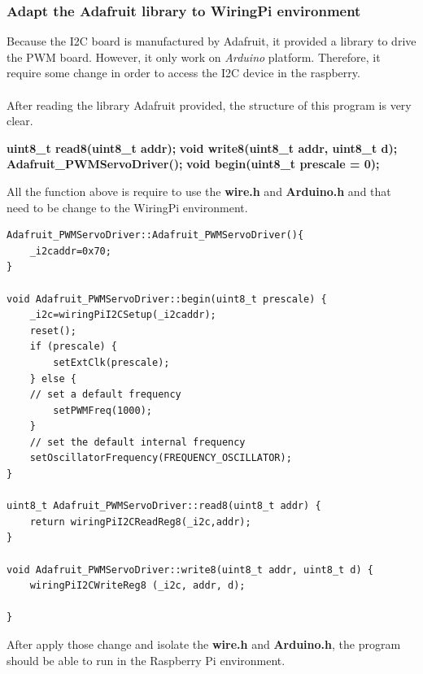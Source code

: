 \documentclass{article}
\begin{document}
\subsubsection{Adapt the Adafruit library to WiringPi environment}
Because the I2C board is manufactured by Adafruit, it provided a library to drive the PWM board. However, it only work on \textit{Arduino} platform. Therefore, it require some change in order to access the I2C device in the raspberry.
\\\\
After reading the library Adafruit provided, the structure of this program is very clear.
\begin{center}
	\textbf{uint8\_t read8(uint8\_t addr);}
	\textbf{void write8(uint8\_t addr, uint8\_t d);}
	\textbf{Adafruit\_PWMServoDriver();}
	\textbf{void begin(uint8\_t prescale = 0);}
\end{center}
All the function above is require to use the \textbf{wire.h} and \textbf{Arduino.h} and that need to be change to the WiringPi environment.
\begin{lstlisting}
Adafruit_PWMServoDriver::Adafruit_PWMServoDriver(){
	_i2caddr=0x70;	
}

void Adafruit_PWMServoDriver::begin(uint8_t prescale) {
	_i2c=wiringPiI2CSetup(_i2caddr);
	reset();
	if (prescale) {
		setExtClk(prescale);
	} else {
	// set a default frequency
		setPWMFreq(1000);
	}
	// set the default internal frequency
	setOscillatorFrequency(FREQUENCY_OSCILLATOR);
}

uint8_t Adafruit_PWMServoDriver::read8(uint8_t addr) {
	return wiringPiI2CReadReg8(_i2c,addr);
}

void Adafruit_PWMServoDriver::write8(uint8_t addr, uint8_t d) {
	wiringPiI2CWriteReg8 (_i2c, addr, d);

}
\end{lstlisting}
After apply those change and isolate the \textbf{wire.h} and \textbf{Arduino.h}, the program should be able to run in the Raspberry Pi environment.
\end{document}
